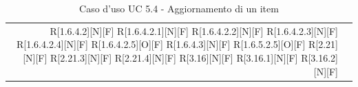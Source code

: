 \documentclass[a4paper]{article}
\begin{document}
\begin{table}[H]
\begin{tabularx}{\textwidth}{r X}
R[1.6.4.2][N][F] \newline
R[1.6.4.2.1][N][F] \newline
R[1.6.4.2.2][N][F] \newline
R[1.6.4.2.3][N][F] \newline
R[1.6.4.2.4][N][F] \newline
R[1.6.4.2.5][O][F] \newline
R[1.6.4.3][N][F] \newline
R[1.6.5.2.5][O][F] \newline
R[2.21][N][F] \newline
R[2.21.3][N][F] \newline
R[2.21.4][N][F] \newline
R[3.16][N][F] \newline
R[3.16.1][N][F] \newline
R[3.16.2][N][F]  \\
			\end{tabularx}
			\caption{Caso d'uso UC 5.4 - Aggiornamento di un item}
		 \end{table} 
		 
\end{document}
